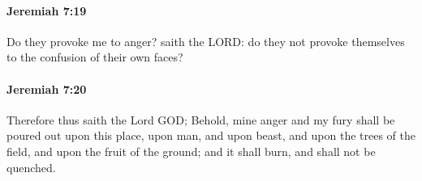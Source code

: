 		\paragraph{Jeremiah 7:19} %
			\label{JEREMIAH-7-19}

			Do they provoke me to anger? saith the LORD: do they not provoke themselves to the confusion of their own faces?


		\paragraph{Jeremiah 7:20} %
			\label{JEREMIAH-7-20}

			Therefore thus saith the Lord GOD; Behold, mine anger and my fury shall be poured out upon this place, upon man, and upon beast, and upon the trees of the field, and upon the fruit of the ground; and it shall burn, and shall not be quenched.


